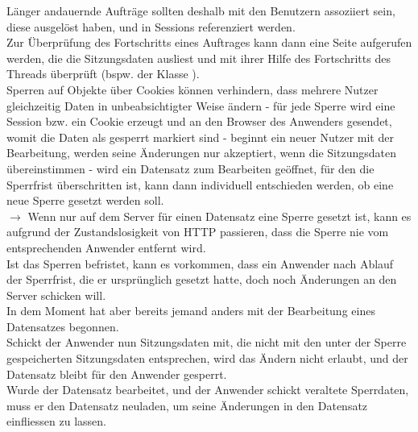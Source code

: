 \noindent
Länger andauernde Aufträge sollten deshalb mit den Benutzern assoziiert sein, diese ausgelöst haben, und in Sessions referenziert werden.\\

\noindent
Zur Überprüfung des Fortschritts eines Auftrages kann dann eine Seite aufgerufen werden, die die Sitzungsdaten ausliest und mit ihrer Hilfe des Fortschritts des Threads überprüft (bspw.  der Klasse ).\\

\noindent
Sperren auf Objekte über Cookies können verhindern, dass mehrere Nutzer gleichzeitig Daten in unbeabsichtigter Weise ändern - für jede Sperre wird eine Session {bzw.} ein Cookie erzeugt und an den Browser des Anwenders gesendet, womit die Daten als gesperrt markiert sind - beginnt ein neuer Nutzer mit der Bearbeitung, werden seine Änderungen nur akzeptiert, wenn die Sitzungsdaten übereinstimmen - wird ein Datensatz zum Bearbeiten geöffnet, für den die Sperrfrist überschritten ist, kann dann individuell entschieden werden, ob eine neue Sperre gesetzt werden soll.\\

\noindent
$\rightarrow$ Wenn nur auf dem Server für einen Datensatz eine Sperre gesetzt ist, kann es aufgrund der Zustandslosigkeit von HTTP passieren, dass die Sperre nie vom entsprechenden Anwender entfernt wird.\\
Ist das Sperren befristet, kann es vorkommen, dass ein Anwender nach Ablauf der Sperrfrist, die er ursprünglich gesetzt hatte, doch noch Änderungen an den Server schicken will.\\
In dem Moment hat aber bereits jemand anders mit der Bearbeitung eines Datensatzes begonnen.\\
Schickt der Anwender nun Sitzungsdaten mit, die nicht mit den unter der Sperre gespeicherten Sitzungsdaten entsprechen, wird das Ändern nicht erlaubt, und der Datensatz bleibt für den Anwender gesperrt.\\
Wurde der Datensatz bearbeitet, und der Anwender schickt veraltete Sperrdaten, muss er den Datensatz neuladen, um seine Änderungen in den Datensatz einfliessen zu lassen.